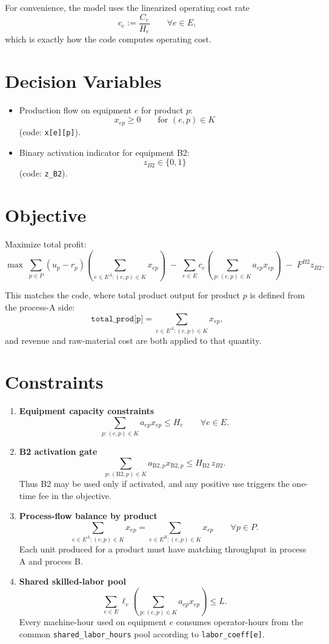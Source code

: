 For convenience, the model uses the linearized operating cost rate
\[
c_e := \frac{C_e}{H_e}\qquad \forall e\in E,
\]
which is exactly how the code computes operating cost.

\section*{Decision Variables}

\begin{itemize}
    \item Production flow on equipment $e$ for product $p$:
    \[
    x_{ep}\ge 0 \qquad \text{for } (e,p)\in K
    \]
    (code: \texttt{x[e][p]}).
    \item Binary activation indicator for equipment B2:
    \[
    z_{B2}\in\{0,1\}
    \]
    (code: \texttt{z\_B2}).
\end{itemize}

\section*{Objective}

Maximize total profit:
\[
\max \;
\sum_{p\in P}(u_p-r_p)\left(\sum_{e\in E^A:(e,p)\in K} x_{ep}\right)
\;-\;
\sum_{e\in E} c_e \left(\sum_{p:(e,p)\in K} a_{ep}x_{ep}\right)
\;-\;
F^{B2} z_{B2}.
\]

This matches the code, where total product output for product $p$ is defined from the process-A side:
\[
\texttt{total\_prod[p]}=\sum_{e\in E^A:(e,p)\in K} x_{ep},
\]
and revenue and raw-material cost are both applied to that quantity.

\section*{Constraints}

\begin{enumerate}
    \item \textbf{Equipment capacity constraints}
    \[
    \sum_{p:(e,p)\in K} a_{ep}x_{ep}\le H_e
    \qquad \forall e\in E.
    \]

    \item \textbf{B2 activation gate}
    \[
    \sum_{p:(\text{B2},p)\in K} a_{\text{B2},p}x_{\text{B2},p}
    \le H_{\text{B2}}\, z_{B2}.
    \]
    Thus B2 may be used only if activated, and any positive use triggers the one-time fee in the objective.

    \item \textbf{Process-flow balance by product}
    \[
    \sum_{e\in E^A:(e,p)\in K} x_{ep}
    =
    \sum_{e\in E^B:(e,p)\in K} x_{ep}
    \qquad \forall p\in P.
    \]
    Each unit produced for a product must have matching throughput in process A and process B.

    \item \textbf{Shared skilled-labor pool}
    \[
    \sum_{e\in E}\ell_e\left(\sum_{p:(e,p)\in K} a_{ep}x_{ep}\right)\le L.
    \]
    Every machine-hour used on equipment $e$ consumes operator-hours from the common \texttt{shared\_labor\_hours} pool according to \texttt{labor\_coeff[e]}.
\end{enumerate}


